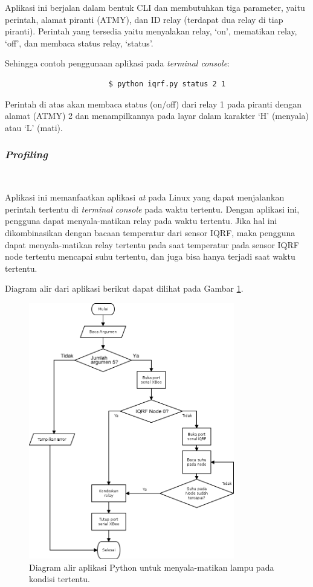 				Aplikasi ini berjalan dalam bentuk CLI dan membutuhkan tiga parameter, yaitu perintah, alamat piranti (ATMY), dan ID relay (terdapat dua relay di tiap piranti). Perintah yang tersedia yaitu menyalakan relay, `on', mematikan relay, `off', dan membaca status relay, `status'.

				Sehingga contoh penggunaan aplikasi pada \emph{terminal console}:
				\begingroup
				    \fontsize{10pt}{12pt}\selectfont
				    \begin{verbatim}
						$ python iqrf.py status 2 1
				    \end{verbatim}  
				\endgroup
				Perintah di atas akan membaca status (on/off) dari relay 1 pada piranti dengan alamat (ATMY) 2 dan menampilkannya pada layar dalam karakter `H' (menyala) atau `L' (mati).

			\subsubsection{\emph{Profiling}}\

				Aplikasi ini memanfaatkan aplikasi \emph{at} pada Linux yang dapat menjalankan perintah tertentu di \emph{terminal console} pada waktu tertentu. Dengan aplikasi ini, pengguna dapat menyala-matikan relay pada waktu tertentu. Jika hal ini dikombinasikan dengan bacaan temperatur dari sensor IQRF, maka pengguna dapat menyala-matikan relay tertentu pada saat temperatur pada sensor IQRF node tertentu mencapai suhu tertentu, dan juga bisa hanya terjadi saat waktu tertentu.

				Diagram alir dari aplikasi berikut dapat dilihat pada Gambar \ref{python-profile}.

				\begin{figure}[H]
				  \centering
				    \includegraphics[width=0.8\textwidth]{gambar/python-profile}
				    \caption{Diagram alir aplikasi Python untuk menyala-matikan lampu pada kondisi tertentu.}
				    \label{python-profile}
				\end{figure}


